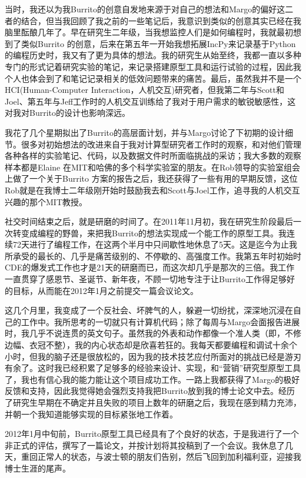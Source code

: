 \documentclass[letter,12pt]{book}
\begin{document}
\begin{CJK}{UTF8}{gbsn}
当时，我还以为我Burrito的创意自发地来源于对自己的想法和Margo的偏好这二者的结合，但当我回顾了我之前的一些笔记后，我意识到类似的创意其实已经在我脑里酝酿几年了。早在研究生二年级，当我想监控人们是如何编程时，我就最初想到了类似Burrito 的创意，后来在第五年一开始我想拓展IncPy来记录基于Python的编程历史时，我又有了更为具体的想法。我的研究生从始至终，我都一直以多种专门的形式记着研究实验的笔记，来记录搭建原型工具和运行试验的过程，因此我个人也体会到了和笔记记录相关的低效问题带来的痛苦。最后，虽然我并不是一个HCI(Human-Computer Interaction，人机交互)研究者，但我第二年与Scott和Joel、第五年与Jeff工作时的人机交互训练给了我对于用户需求的敏锐敏感性，这对我对Burrito的设计也影响深远。

我花了几个星期拟出了Burrito的高层面计划，并与Margo讨论了下初期的设计细节。很多对初始想法的改进来自于我对计算型研究者工作时的观察，和对他们管理各种各样的实验笔记、代码，以及数据文件时所面临挑战的采访；我大多数的观察样本都是Elaine 在MIT和哈佛的多个科学实验室的朋友。在Rob领导的实验室组会上做了一个关于Burrito 方案的报告之后，我还获得了一些有用的早期反馈，这位Rob就是在我博士二年级刚开始时鼓励我去和Scott与Joel工作，追寻我的人机交互兴趣的那个MIT教授。

\breakline

社交时间结束之后，就是研磨的时间了。在2011年11月初，我在研究生阶段最后一次转变成编程的野兽，来把我Burrito的想法实现成一个能工作的原型工具。我连续72天进行了编程工作，在这两个半月中只间歇性地休息了5天。这是迄今为止我所承受的最长的、几乎是痛苦级别的、不停歇的、高强度工作。我第五年时初始时CDE的爆发式工作也才是21天的研磨而已，而这次却几乎是那次的三倍。我工作一直贯穿了感恩节、圣诞节、新年夜，不顾一切地专注于让Burrito工作得足够好的目标，从而能在2012年1月之前提交一篇会议论文。

这几个月里，我变成了一个反社会、坏脾气的人，躲避一切纷扰，深深地沉浸在自己的工作中。我所思考的一切就只有计算机代码；除了每周与Margo会面报告进展时，我几乎不说连贯的英文句子。虽然我的外表和动作都像一个准人类（即，不修边幅、衣冠不整），我的内心状态却是欣喜若狂的。我每天都要编程和调试十余个小时，但我的脑子还是很放松的，因为我的技术技艺应付所面对的挑战已经是游刃有余了。这时我已经积累了足够多的经验来设计、实现，和“营销”研究型原型工具了，我也有信心我的能力能让这个项目成功工作。一路上我都获得了Margo的极好反馈和支持，因此我觉得她会强烈支持我把Burrito放到我的博士论文中去。经历了研究生早期在不确定并且失败的项目上数年的研磨之后，我现在感到精力充沛，并朝一个我知道能够实现的目标紧张地工作着。

2012年1月中旬前，Burrito原型工具已经具有了个良好的状态，于是我进行了一个非正式的评估，撰写了一篇论文，并按计划将其投稿到了一个会议。我休息了几天，重回正常人的状态，与波士顿的朋友们告别，然后飞回到加利福利亚，迎接我博士生涯的尾声。


\end{CJK}
\end{document}
